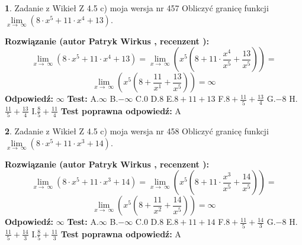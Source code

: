 \documentclass[12pt, a4paper]{article}
\theoremstyle{definition} %
\newtheorem{zad}{}
\newcommand{\zadStart}[1]{\begin{zad}#1\newline}
\newcommand{\zadStop}{\end{zad}}
\newcommand{\rozwStart}[2]{\noindent \textbf{Rozwiązanie (autor #1 , recenzent #2): }\newline}
\newcommand{\rozwStop}{\newline}
\newcommand{\odpStart}{\noindent \textbf{Odpowiedź:}\newline}
\newcommand{\odpStop}{\newline}
\newcommand{\testStart}{\noindent \textbf{Test:}\newline}
\newcommand{\testStop}{\newline}
\newcommand{\kluczStart}{\noindent \textbf{Test poprawna odpowiedź:}\newline}
\newcommand{\kluczStop}{\newline}
\begin{document}
\zadStart{Zadanie z Wikieł Z 4.5 c) moja wersja nr 457}
Obliczyć granicę funkcji  $\lim\limits_{x\to\ \infty}(8 \cdot x^{5}+11 \cdot x^{4}+13)$.
\zadStop
\rozwStart{Patryk Wirkus}{}
$$\lim\limits_{x\to\ \infty}(8 \cdot x^{5}+11 \cdot x^{4}+13) = \lim\limits_{x\to\ \infty}(x^{5}(8 +11 \cdot \frac{x^{4}}{x^{5}}+\frac{13}{x^{5}})) =$$ $$\lim\limits_{x\to\ \infty}(x^{5}(8 +\frac{11}{x^{1}}+\frac{13}{x^{5}})) =\infty$$
\rozwStop
\odpStart
$\infty$
\odpStop
\testStart
A.$\infty$ B.$-\infty$ C.$0$ D.$8$ E.$8 + 11 + 13$
F.$8+\frac{11}{5}+\frac{13}{4}$ G.$-8$
H.$\frac{11}{5}+\frac{13}{4}$
I.$\frac{8}{5}+\frac{11}{4}$
\testStop
\kluczStart
A
\kluczStop



\zadStart{Zadanie z Wikieł Z 4.5 c) moja wersja nr 458}
Obliczyć granicę funkcji  $\lim\limits_{x\to\ \infty}(8 \cdot x^{5}+11 \cdot x^{3}+14)$.
\zadStop
\rozwStart{Patryk Wirkus}{}
$$\lim\limits_{x\to\ \infty}(8 \cdot x^{5}+11 \cdot x^{3}+14) = \lim\limits_{x\to\ \infty}(x^{5}(8 +11 \cdot \frac{x^{3}}{x^{5}}+\frac{14}{x^{5}})) =$$ $$\lim\limits_{x\to\ \infty}(x^{5}(8 +\frac{11}{x^{2}}+\frac{14}{x^{5}})) =\infty$$
\rozwStop
\odpStart
$\infty$
\odpStop
\testStart
A.$\infty$ B.$-\infty$ C.$0$ D.$8$ E.$8 + 11 + 14$
F.$8+\frac{11}{5}+\frac{14}{3}$ G.$-8$
H.$\frac{11}{5}+\frac{14}{3}$
I.$\frac{8}{5}+\frac{11}{3}$
\testStop
\kluczStart
A
\kluczStop
\end{document}
